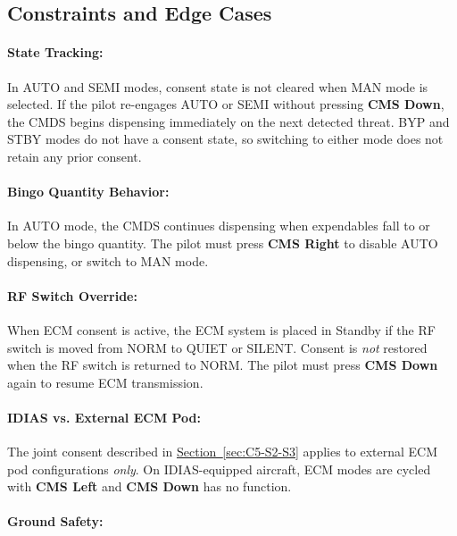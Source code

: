 \documentclass[11pt, a4paper, twoside]{report}
\newcommand{\secref}[1]{\hyperref[#1]{Section~\ref*{#1}}}
\begin{document}
\subsection{Constraints and Edge Cases}
\label{sec:C5-S2-S4}

\paragraph{State Tracking:}

In AUTO and SEMI modes, consent state is not cleared when MAN mode is selected. If the pilot re-engages AUTO or SEMI without pressing \textbf{CMS Down}, the CMDS begins dispensing immediately on the next detected threat. BYP and STBY modes do not have a consent state, so switching to either mode does not retain any prior consent.

\paragraph{Bingo Quantity Behavior:}

In AUTO mode, the CMDS continues dispensing when expendables fall to or below the bingo quantity. The pilot must press \textbf{CMS Right} to disable AUTO dispensing, or switch to MAN mode.

\paragraph{RF Switch Override:}

When ECM consent is active, the ECM system is placed in Standby if the RF switch is moved from NORM to QUIET or SILENT. Consent is \textit{not} restored when the RF switch is returned to NORM. The pilot must press \textbf{CMS Down} again to resume ECM transmission.

\paragraph{IDIAS vs. External ECM Pod:}

The joint consent described in \secref{sec:C5-S2-S3} applies to external ECM pod configurations \textit{only}. On IDIAS-equipped aircraft, ECM modes are cycled with \textbf{CMS Left} and \textbf{CMS Down} has no function.

\paragraph{Ground Safety:}
\end{document}
